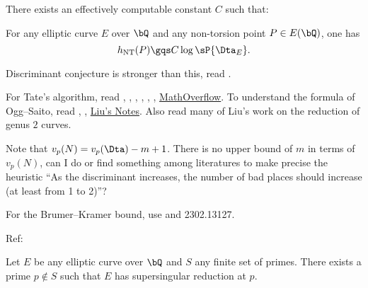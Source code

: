 \documentclass[article, a4paper, twoside]{universal}
\begin{document}
\begin{cnj}[Lang]
	There exists an effectively computable constant $C$ such that:

	For any elliptic curve $E$ over $\bQ$ and any non-torsion point $P\in E(\bQ)$, one has
	\[
		h_{\text{NT}}(P)\gqs C\log\sP{\Dta_{E}}.
	\]
\end{cnj}

\begin{rmk}
	Discriminant conjecture is stronger than this, read \cite{HS1988}.
\end{rmk}


For Tate's algorithm, read \cite{Tate1975}, \cite[Page~365]{Silverman1994}, \cite{Liu2002}, \cite{Lorenzini2010}, \cite{Szydlo1999}, \cite{Szydlo2004}, \href{https://mathoverflow.net/questions/127908/reduction-types-of-elliptic-curves}{MathOverflow}. To understand the formula of Ogg--Saito, read \cite{Ogg1967}, \cite{Saito1988Noether}, \href{https://www.math.u-bordeaux.fr/~qliu/Notes/Ogg-Saito.pdf}{Liu's Notes}. Also read many of Liu's work on the reduction of genus $2$ curves.

\begin{qst}
	Note that $v_{p}(N)=v_{p}(\Dta)-m+1$. There is no upper bound of $m$ in terms of $v_{p}(N)$, can I do or find something among literatures to make precise the heuristic ``As the discriminant increases, the number of bad places should increase (at least from 1 to 2)''?
\end{qst}

For the Brumer--Kramer bound, use \cite{BK1994} and 2302.13127.


Ref:~\cite{Gross1982Minimal,Silverman1984}



\begin{thm}
	Let $E$ be any elliptic curve over $\bQ$ and $S$ any finite set of primes. There exists a prime $p\nin S$ such that $E$ has supersingular reduction at $p$.
\end{thm}
\end{document}
